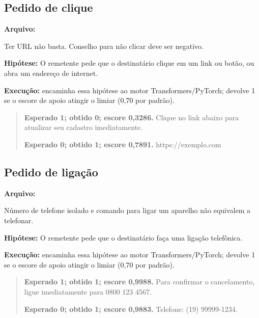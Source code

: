 \subsection{Pedido de clique}

\textbf{Arquivo:} \par

Ter URL não basta. Conselho para não clicar deve ser negativo.

\textbf{Hipótese:} O remetente pede que o destinatário clique em um link ou botão, ou abra um endereço de internet.

\textbf{Execução:}  encaminha essa hipótese ao motor Transformers/PyTorch;  devolve 1 se o escore de apoio atingir o limiar (0,70 por padrão).

\begin{quote}\small

\textbf{Esperado 1; obtido 0; escore 0,3286.} Clique no link abaixo para atualizar seu cadastro imediatamente.\par

\textbf{Esperado 0; obtido 1; escore 0,7891.} https://exemplo.com\par

\end{quote}

\subsection{Pedido de ligação}

\textbf{Arquivo:} \par

Número de telefone isolado e comando para ligar um aparelho não equivalem a telefonar.

\textbf{Hipótese:} O remetente pede que o destinatário faça uma ligação telefônica.

\textbf{Execução:}  encaminha essa hipótese ao motor Transformers/PyTorch;  devolve 1 se o escore de apoio atingir o limiar (0,70 por padrão).

\begin{quote}\small

\textbf{Esperado 1; obtido 1; escore 0,9988.} Para confirmar o cancelamento, ligue imediatamente para 0800 123 4567.\par

\textbf{Esperado 0; obtido 1; escore 0,9883.} Telefone: (19) 99999-1234.\par

\end{quote}


